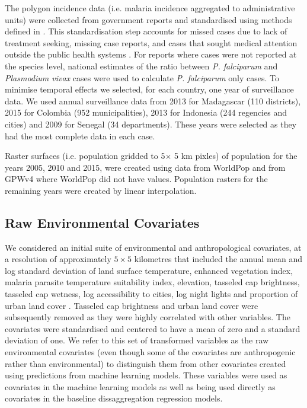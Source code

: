 \documentclass[review]{elsarticle}
\begin{document}
The polygon incidence data (i.e. malaria incidence aggregated to administrative units) were collected from government reports and standardised using methods defined in \cite{cibulskis2011worldwide}.
This standardisation step accounts for missed cases due to lack of treatment seeking, missing case reports, and cases that sought medical attention outside the public health systems \citep{battle2016treatment}.
For reports where cases were not reported at the species level, national estimates of the ratio between \emph{P. falciparum} and \emph{Plasmodium vivax} cases were used to calculate \emph{P. falciparum} only cases. 
To minimise temporal effects we selected, for each country, one year of surveillance data. 
We used annual surveillance data from 2013 for Madagascar (110 districts), 2015 for Colombia (952 municipalities), 2013 for Indonesia (244 regencies and cities) and 2009 for Senegal (34 departments).
These years were selected as they had the most complete data in each case.

Raster surfaces (i.e. population gridded to 5$ \times$ 5 km pixles) of population for the years 2005, 2010 and 2015, were created using data from WorldPop \citep{linard2012population,gaughan2013high,  sorichetta2015high} and from GPWv4 \citep{gpw4} where WorldPop did not have values. 
Population rasters for the remaining years were created by linear interpolation. 

\subsection{Raw Environmental Covariates}

We considered an initial suite of environmental and anthropological covariates, at a resolution of approximately $5 \times 5$ kilometres that included the annual mean and log standard deviation of land surface temperature, enhanced vegetation index, malaria parasite temperature suitability index, elevation, tasseled cap brightness, tasseled cap wetness, log accessibility to cities, log night lights and proportion of urban land cover \citep{weiss2014air, weiss2015re, weiss2018global}. 
Tasseled cap brightness and urban land cover were subsequently removed as they were highly correlated with other variables. 
The covariates were standardised and centered to have a mean of zero and a standard deviation of one. 
We refer to this set of transformed variables as the raw environmental covariates (even though some of the covariates are anthropogenic rather than environmental) to distinguish them from other covariates created using predictions from machine learning models.
These variables were used as covariates in the machine learning models as well as being used directly as covariates in the baseline dissaggregation regression models.
\end{document}
